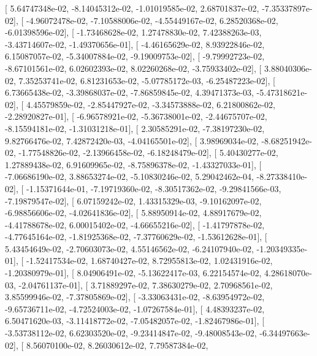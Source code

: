 \documentclass{article}
\begin{document}
       [  5.64747348e-02,  -8.14045312e-02,  -1.01019585e-02,
          2.68701837e-02,  -7.35337897e-02],
       [ -4.96072478e-02,  -7.10588006e-02,  -4.55449167e-02,
          6.28520368e-02,  -6.01398596e-02],
       [ -1.73468628e-02,   1.27478830e-02,   7.42388263e-03,
         -3.43714607e-02,  -1.49370656e-01],
       [ -4.46165629e-02,   8.93922846e-02,   6.15087057e-02,
         -5.34007884e-02,  -9.19009753e-02],
       [ -9.79992723e-02,  -8.67101561e-02,   6.02602393e-02,
          8.02260268e-02,  -3.75933402e-02],
       [  3.88040306e-02,   7.35253741e-02,   6.81231653e-02,
         -5.07785172e-03,  -6.25487223e-02],
       [  6.73665438e-02,  -3.39868037e-02,  -7.86859845e-02,
          4.39471373e-03,  -5.47318621e-02],
       [  4.45579859e-02,  -2.85447927e-02,  -3.34573888e-02,
          6.21800862e-02,  -2.28920827e-01],
       [ -6.96578921e-02,  -5.36738001e-02,  -2.44675707e-02,
         -8.15594181e-02,  -1.31031218e-01],
       [  2.30585291e-02,  -7.38197230e-02,   9.82766476e-02,
          7.42872420e-03,  -4.04165501e-02],
       [  3.98969034e-02,  -8.68251942e-02,  -1.77548826e-02,
         -2.13966458e-02,  -6.18248479e-02],
       [  5.40430277e-02,   1.27889438e-02,   6.91609965e-02,
         -8.75896378e-02,  -1.43327033e-01],
       [ -7.06686190e-02,   3.88653274e-02,  -5.10830246e-02,
          5.29042462e-04,  -8.27338410e-02],
       [ -1.15371644e-01,  -7.19719360e-02,  -8.30517362e-02,
         -9.29841566e-03,  -7.19879547e-02],
       [  6.07159242e-02,   1.43315329e-03,  -9.10162097e-02,
         -6.98856606e-02,  -4.02641836e-02],
       [  5.88950914e-02,   4.88917679e-02,  -4.41788678e-02,
          6.00015402e-02,  -4.66655216e-02],
       [ -1.41797878e-02,  -4.77645164e-02,  -1.81925368e-02,
         -7.37760629e-02,  -1.53612628e-01],
       [  5.43454649e-02,  -2.70603073e-02,   4.55146562e-02,
         -6.24107940e-02,  -1.20349335e-01],
       [ -1.52417534e-02,   1.68740427e-02,   8.72955813e-02,
          1.02431916e-02,  -1.20380979e-01],
       [  8.04906491e-02,  -5.13622417e-03,   6.22154574e-02,
          4.28618070e-03,  -2.04761137e-01],
       [  3.71889297e-02,   7.38630279e-02,   2.70968561e-02,
          3.85599946e-02,  -7.37805869e-02],
       [ -3.33063431e-02,  -8.63954972e-02,  -9.65736711e-02,
         -4.72524003e-02,  -1.07267584e-01],
       [  4.48393237e-02,   6.50471620e-03,  -3.11418772e-02,
         -7.05482057e-02,  -1.82467986e-01],
       [ -3.53738112e-02,   6.62303520e-02,  -9.23414847e-02,
         -9.48008543e-02,  -6.34497663e-02],
       [  8.56070100e-02,   8.26030612e-02,   7.79587384e-02,
\end{document}
